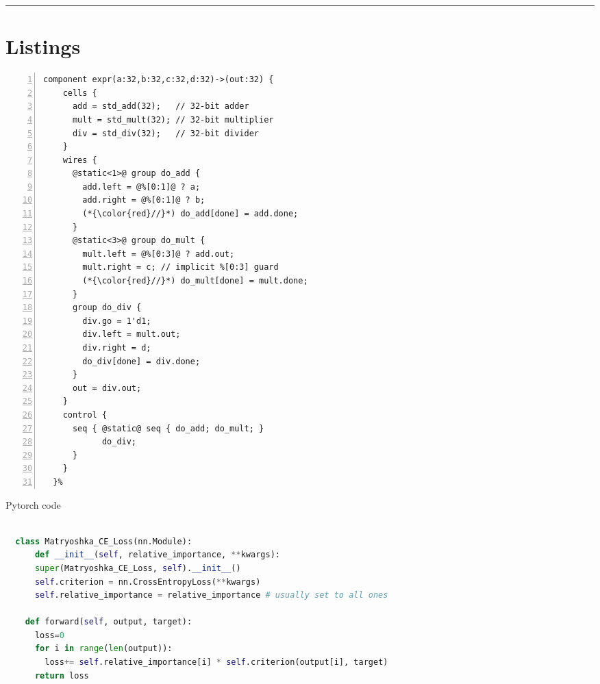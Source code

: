 \documentclass{article}
\begin{document}
\hrule

\section{Listings}

\begin{lstlisting}[language=calyxspec,numbers=left, belowskip=-0.8\baselineskip]
  component expr(a:32,b:32,c:32,d:32)->(out:32) {
    cells {
      add = std_add(32);   // 32-bit adder
      mult = std_mult(32); // 32-bit multiplier
      div = std_div(32);   // 32-bit divider
    }
    wires {
      @static<1>@ group do_add {
        add.left = @%[0:1]@ ? a;
        add.right = @%[0:1]@ ? b;
        (*{\color{red}//}*) do_add[done] = add.done;
      }
      @static<3>@ group do_mult {
        mult.left = @%[0:3]@ ? add.out;
        mult.right = c; // implicit %[0:3] guard
        (*{\color{red}//}*) do_mult[done] = mult.done;
      }
      group do_div {
        div.go = 1'd1;
        div.left = mult.out;
        div.right = d;
        do_div[done] = div.done;
      }
      out = div.out;
    }
    control {
      seq { @static@ seq { do_add; do_mult; }
            do_div;
      }
    }
  }%
\end{lstlisting}


\begin{algorithm}[!h]
  \caption{\large Pytorch code} 
\begin{lstlisting}[language=Python]

  class Matryoshka_CE_Loss(nn.Module):
      def __init__(self, relative_importance, **kwargs):
      super(Matryoshka_CE_Loss, self).__init__()
      self.criterion = nn.CrossEntropyLoss(**kwargs)
      self.relative_importance = relative_importance # usually set to all ones
  
    def forward(self, output, target):
      loss=0
      for i in range(len(output)):
        loss+= self.relative_importance[i] * self.criterion(output[i], target)
      return loss
\end{lstlisting}
\end{algorithm}
\end{document}
